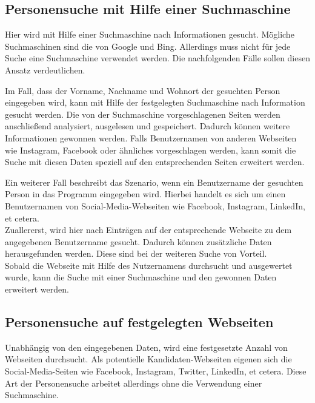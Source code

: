 	\subsection{Personensuche mit Hilfe einer Suchmaschine}
	\label{subsubsec:PersonensucheMitHilfevonSuchmaschine}
	Hier wird mit Hilfe einer Suchmaschine nach Informationen gesucht. Mögliche Suchmaschinen sind die von Google und Bing. Allerdings muss nicht für jede Suche eine Suchmaschine verwendet werden. Die nachfolgenden Fälle sollen diesen Ansatz verdeutlichen.
	
	Im Fall, dass der Vorname, Nachname und Wohnort der gesuchten Person eingegeben wird, kann mit Hilfe der festgelegten Suchmaschine nach Information gesucht werden. Die von der Suchmaschine vorgeschlagenen Seiten werden anschließend analysiert, ausgelesen und gespeichert. Dadurch können weitere Informationen gewonnen werden. Falls Benutzernamen von anderen Webseiten wie Instagram, Facebook oder ähnliches vorgeschlagen werden, kann somit die Suche mit diesen Daten speziell auf den entsprechenden Seiten erweitert werden.
	
	Ein weiterer Fall beschreibt das Szenario, wenn ein Benutzername der gesuchten Person in das Programm eingegeben wird. Hierbei handelt es sich um einen Benutzernamen von Social-Media-Webseiten wie Facebook, Instagram, LinkedIn, et cetera. \\
	Zuallererst, wird hier nach Einträgen auf der entsprechende Webseite zu dem angegebenen Benutzername gesucht. Dadurch können zusätzliche Daten herausgefunden werden. Diese sind bei der weiteren Suche von Vorteil.\\
	Sobald die Webseite mit Hilfe des Nutzernamens durchsucht und ausgewertet wurde, kann die Suche mit einer Suchmaschine und den gewonnen Daten erweitert werden.
	
	\subsection{Personensuche auf festgelegten Webseiten}
	\label{subsubsec:PersonensucheohneSuchmaschine}
	Unabhängig von den eingegebenen Daten, wird eine festgesetzte Anzahl von Webseiten durchsucht. Als potentielle Kandidaten-Webseiten eigenen sich die Social-Media-Seiten wie Facebook, Instagram, Twitter, LinkedIn, et cetera. Diese Art der Personensuche arbeitet allerdings ohne die Verwendung einer Suchmaschine.
	
